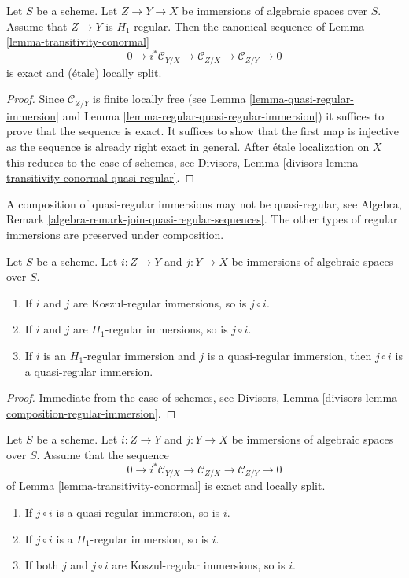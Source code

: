 \begin{lemma}
\label{lemma-transitivity-conormal-quasi-regular}
Let $S$ be a scheme. Let $Z \to Y \to X$ be immersions of algebraic spaces
over $S$. Assume that $Z \to Y$ is $H_1$-regular. Then the canonical
sequence of Lemma \ref{lemma-transitivity-conormal}
$$
0 \to i^*\mathcal{C}_{Y/X} \to
\mathcal{C}_{Z/X} \to
\mathcal{C}_{Z/Y} \to 0
$$
is exact and (\'etale) locally split.
\end{lemma}

\begin{proof}
Since $\mathcal{C}_{Z/Y}$ is finite locally free (see
Lemma \ref{lemma-quasi-regular-immersion}
and
Lemma \ref{lemma-regular-quasi-regular-immersion})
it suffices to prove that the sequence is exact.
It suffices to show that the first map is injective
as the sequence is already right exact in general.
After \'etale localization on $X$ this reduces to the case
of schemes, see
Divisors, Lemma \ref{divisors-lemma-transitivity-conormal-quasi-regular}.
\end{proof}

\noindent
A composition of quasi-regular immersions may not be quasi-regular, see
Algebra, Remark \ref{algebra-remark-join-quasi-regular-sequences}.
The other types of regular immersions are preserved under composition.

\begin{lemma}
\label{lemma-composition-regular-immersion}
Let $S$ be a scheme. Let $i : Z \to Y$ and $j : Y \to X$ be immersions of
algebraic spaces over $S$.
\begin{enumerate}
\item If $i$ and $j$ are Koszul-regular immersions, so is $j \circ i$.
\item If $i$ and $j$ are $H_1$-regular immersions, so is $j \circ i$.
\item If $i$ is an $H_1$-regular immersion and $j$ is a quasi-regular
immersion, then $j \circ i$ is a quasi-regular immersion.
\end{enumerate}
\end{lemma}

\begin{proof}
Immediate from the case of schemes, see
Divisors, Lemma \ref{divisors-lemma-composition-regular-immersion}.
\end{proof}

\begin{lemma}
\label{lemma-permanence-regular-immersion}
Let $S$ be a scheme. Let $i : Z \to Y$ and $j : Y \to X$ be immersions of
algebraic spaces over $S$. Assume that the sequence
$$
0 \to i^*\mathcal{C}_{Y/X} \to
\mathcal{C}_{Z/X} \to
\mathcal{C}_{Z/Y} \to 0
$$
of Lemma \ref{lemma-transitivity-conormal} is exact and locally split.
\begin{enumerate}
\item If $j \circ i$ is a quasi-regular immersion, so is $i$.
\item If $j \circ i$ is a $H_1$-regular immersion, so is $i$.
\item If both $j$ and $j \circ i$ are Koszul-regular immersions, so is $i$.
\end{enumerate}
\end{lemma}


